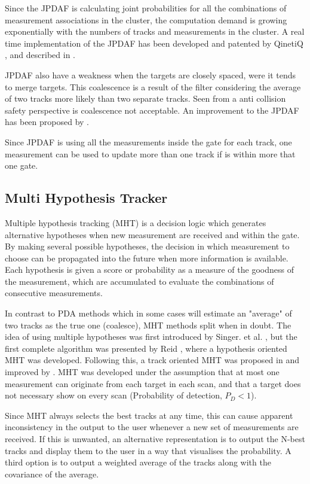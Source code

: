 Since the JPDAF is calculating joint probabilities for all the combinations of measurement associations in the cluster, the computation demand is growing exponentially with the numbers of tracks and measurements in the cluster. A real time implementation of the JPDAF has been developed and patented by QinetiQ \cite{QinetiQ2003}, and described in \cite{Horridge}.

JPDAF also have a weakness when the targets are closely spaced, were it tends to merge targets. This coalescence is a result of the filter considering the average of two tracks more likely than two separate tracks. Seen from a anti collision safety perspective is coalescence not acceptable. An improvement to the JPDAF has been proposed by \cite{Blom2000}.

Since JPDAF is using all the measurements inside the gate for each track, one measurement can be used to update more than one track if is within more that one gate.

\subsection{Multi Hypothesis Tracker}
Multiple hypothesis tracking (MHT) is a decision logic which generates alternative hypotheses when new measurement are received and within the gate. By making several possible hypotheses, the decision in which measurement to choose can be propagated into the future when more information is available. Each hypothesis is given a score or probability as a measure of the goodness of the measurement, which are accumulated to evaluate the combinations of consecutive measurements.

In contrast to PDA methods which in some cases will estimate an "average" of two tracks as the true one (coalesce), MHT methods split when in doubt. The idea of using multiple hypotheses was first introduced by Singer. et al. \cite{Singer1974}, but the first complete algorithm was presented by Reid \cite{Reid1978}, where a hypothesis oriented MHT was developed. Following this, a track oriented MHT was proposed in \cite{Kurien1990} and improved by \cite{Bar-Shalom2007}. MHT was developed under the assumption that at most one measurement can originate from each target in each scan, and that a target does not necessary show on every scan (Probability of detection, $P_D < 1$).

Since MHT always selects the best tracks at any time, this can cause apparent inconsistency in the output to the user whenever a new set of measurements are received. If this is unwanted, an alternative representation is to output the N-best tracks and display them to the user in a way that visualises the probability. A third option is to output a weighted average of the tracks along with the covariance of the average.

